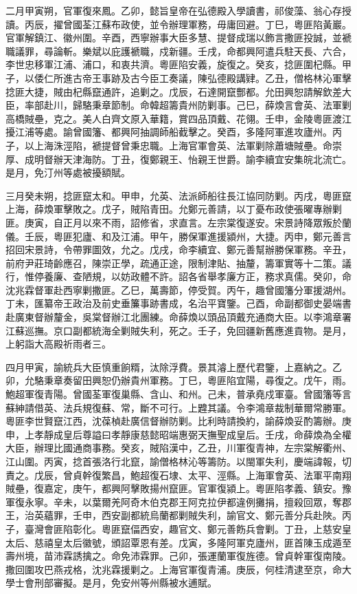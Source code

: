\begin{pinyinscope}
二月甲寅朔，官軍復來鳳。乙卯，懿旨皇帝在弘德殿入學讀書，祁俊藻、翁心存授讀。丙辰，擢曾國荃江蘇布政使，並令辦理軍務，毋庸回避。丁巳，粵匪陷黃巖。官軍解鎮江、徽州圍。辛酉，西寧辦事大臣多慧、提督成瑞以飾言撒匪投誠，並褫職議罪，尋論斬。樂斌以庇護褫職，戍新疆。壬戌，命都興阿遣兵駐天長、六合，李世忠移軍江浦、浦口，和衷共濟。粵匪陷安義，旋復之。癸亥，捻匪圍杞縣。甲子，以倭仁所進古帝王事跡及古今臣工奏議，陳弘德殿講肄。乙丑，僧格林沁軍擊捻匪大捷，賊由杞縣竄通許，追剿之。戊辰，石達開竄酆都。允田興恕請解欽差大臣，率部赴川，歸駱秉章節制。命韓超籌貴州防剿事。己巳，薛煥言會英、法軍剿高橋賊壘，克之。美人白齊文原入華籍，賞四品頂戴、花翎。壬申，金陵粵匪渡江擾江浦等處。諭曾國籓、都興阿抽調師船截擊之。癸酉，多隆阿軍進攻廬州。丙子，以上海洙涇陷，褫提督曾秉忠職。上海官軍會英、法軍剿除蕭塘賊壘。命崇厚、成明督辦天津海防。丁丑，復鄭親王、怡親王世爵。諭李續宜安集皖北流亡。是月，免汀州等處被擾額賦。

三月癸未朔，捻匪竄太和。甲申，允英、法派師船往長江協同防剿。丙戌，粵匪竄上海，薛煥軍擊敗之。戊子，賊陷青田。允鄭元善請，以丁憂布政使張曜專辦剿匪。庚寅，自正月以來不雨，詔修省，求直言。左宗棠復遂安。宋景詩降眾叛於蘭儀。壬辰，粵匪犯廬、和及江浦。甲午，勝保軍進援潁州，大捷。丙申，鄭元善言招回宋景詩，令帶罪圖效，允之。戊戌，命李續宜、鄭元善幫辦勝保軍務。辛丑，前府尹莊琦齡應召，陳崇正學，疏通正途，限制津貼、抽釐，籌軍實等十二策。議行，惟停養廉、查陋規，以妨政體不許。詔各省舉孝廉方正，務求真儒。癸卯，命沈兆霖督軍赴西寧剿撒匪。乙巳，萬壽節，停受賀。丙午，趣曾國籓分軍援湖州。丁未，匯纂帝王政治及前史垂簾事跡書成，名治平寶鑒。己酉，命副都御史晏端書赴廣東督辦釐金，吳棠督辦江北團練。命薛煥以頭品頂戴充通商大臣。以李鴻章署江蘇巡撫。京口副都統海全剿賊失利，死之。壬子，免回疆新舊應進貢物。是月，上躬詣大高殿祈雨者三。

四月甲寅，諭統兵大臣慎重餉糈，汰除浮費。景其濬上歷代君鑒，上嘉納之。乙卯，允駱秉章奏留田興恕仍辦貴州軍務。丁巳，粵匪陷宜陽，尋復之。戊午，雨。鮑超軍復青陽。曾國荃軍復巢縣、含山、和州。己未，普承堯戍軍臺。曾國籓等言蘇紳請借英、法兵規復蘇、常，斷不可行。上韙其議。令李鴻章裁制華爾常勝軍。粵匪李世賢竄江西，沈葆楨赴廣信督辦防剿。比利時請換約，諭薛煥妥酌籌辦。庚申，上孝靜成皇后尊謚曰孝靜康慈懿昭端惠弼天撫聖成皇后。壬戌，命薛煥為全權大臣，辦理比國通商事務。癸亥，賊陷漢中，乙丑，川軍復青神，左宗棠解衢州、江山圍。丙寅，捻首張洛行北竄，諭僧格林沁等籌防。以閩軍失利，慶端諱報，切責之。戊辰，曾貞幹復繁昌，鮑超復石埭、太平、涇縣。上海軍會英、法軍平南翔賊壘，復嘉定，庚午，都興阿擊敗揚州竄匪。官軍復潁上。粵匪陷孝義、鎮安。豫軍復永寧。辛未，以葉爾羌阿奇木伯克郡王阿克拉伊都違例攤捐，擅殺回眾，奪郡王，治英蘊罪，壬申，西安副都統烏蘭都剿賊失利，諭官文、鄭元善分兵赴陜。丙子，臺灣會匪陷彰化。粵匪竄偪西安，趣官文、鄭元善飭兵會剿。丁丑，上慈安皇太后、慈禧皇太后徽號，頒詔覃恩有差。戊寅，多隆阿軍克廬州，匪首陳玉成遁至壽州境，苗沛霖誘擒之。命免沛霖罪。己卯，張運蘭軍復旌德。曾貞幹軍復南陵。撒回圍攻巴燕戎格，沈兆霖援剿之。上海官軍復青浦。庚辰，何桂清逮至京，命大學士會刑部審擬。是月，免安州等州縣被水逋賦。


\end{pinyinscope}
